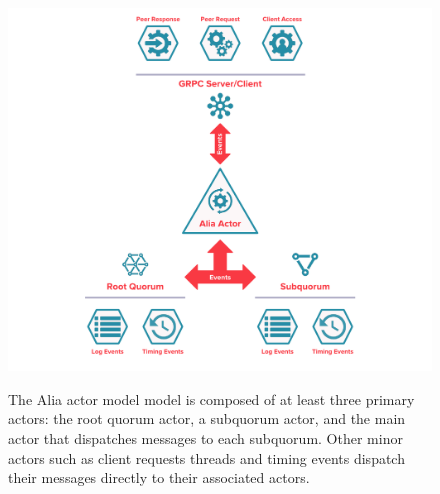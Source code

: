 \begin{figure}
    \begin{center}
        \includegraphics[width=5in]{figures/ch05_hc_actor_model.pdf}
    \end{center}
    \renewcommand{\baselinestretch}{1}
    \small\normalsize

    \begin{quote}
        \caption[Alia Actor Model]{The Alia actor model model is composed of at least three primary actors: the root quorum actor, a subquorum actor, and the main actor that dispatches messages to each subquorum. Other minor actors such as client requests threads and timing events dispatch their messages directly to their associated actors.}
        \label{fig:ch05_hc_actor_model}
    \end{quote}
\end{figure}
\renewcommand{\baselinestretch}{2}
\small\normalsize

